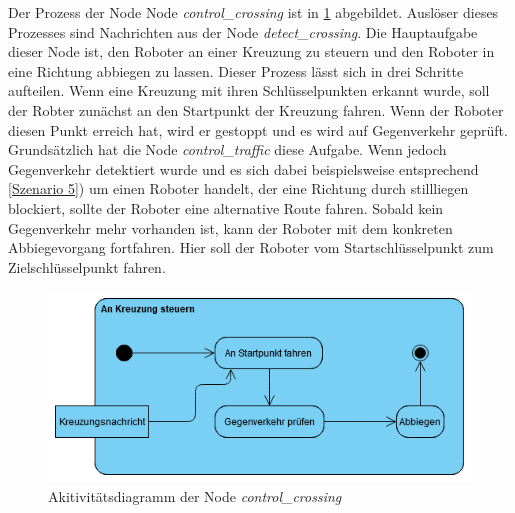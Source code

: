 Der Prozess der Node Node \textit{control\_crossing} ist in \ref{fig:ControlCrossing_Activity} abgebildet. Auslöser dieses Prozesses sind Nachrichten aus der Node \textit{detect\_crossing}.
Die Hauptaufgabe dieser Node ist, den Roboter an einer Kreuzung zu steuern und den Roboter in eine Richtung abbiegen zu lassen. Dieser Prozess lässt sich in drei Schritte aufteilen.
Wenn eine Kreuzung mit ihren Schlüsselpunkten erkannt wurde, soll der Robter zunächst an den Startpunkt der Kreuzung fahren. Wenn der Roboter diesen Punkt erreich hat, wird er gestoppt und es wird
auf Gegenverkehr geprüft. Grundsätzlich hat die Node \textit{control\_traffic} diese Aufgabe. Wenn jedoch Gegenverkehr detektiert wurde und es sich dabei beispielsweise entsprechend \ref{Szenario 5}) 
um einen Roboter handelt, der eine Richtung durch stillliegen blockiert, sollte der Roboter eine alternative Route fahren. Sobald kein Gegenverkehr mehr vorhanden ist, kann der Roboter mit dem konkreten
Abbiegevorgang fortfahren. Hier soll der Roboter vom Startschlüsselpunkt zum Zielschlüsselpunkt fahren.


\begin{figure}[h!]
  \centering
  \includegraphics[width=\linewidth]{images/ControlCrossing_activity.PNG}
  \caption{Akitivitätsdiagramm der Node \textit{control\_crossing}}
  \label{fig:ControlCrossing_Activity}
\end{figure}